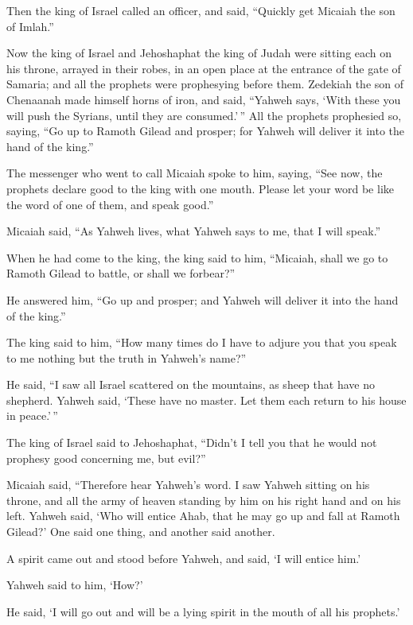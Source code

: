  Then the king of Israel called an officer, and said,
``Quickly get Micaiah the son of Imlah.''

 Now the king of Israel and Jehoshaphat the king of Judah
were sitting each on his throne, arrayed in their robes, in an open
place at the entrance of the gate of Samaria; and all the prophets were
prophesying before them.  Zedekiah the son of Chenaanah
made himself horns of iron, and said, ``Yahweh says, `With these you
will push the Syrians, until they are consumed.'\,''  All
the prophets prophesied so, saying, ``Go up to Ramoth Gilead and
prosper; for Yahweh will deliver it into the hand of the king.''

 The messenger who went to call Micaiah spoke to him,
saying, ``See now, the prophets declare good to the king with one mouth.
Please let your word be like the word of one of them, and speak good.''

 Micaiah said, ``As Yahweh lives, what Yahweh says to me,
that I will speak.''

 When he had come to the king, the king said to him,
``Micaiah, shall we go to Ramoth Gilead to battle, or shall we
forbear?''

He answered him, ``Go up and prosper; and Yahweh will deliver it into
the hand of the king.''

 The king said to him, ``How many times do I have to adjure
you that you speak to me nothing but the truth in Yahweh's name?''

 He said, ``I saw all Israel scattered on the mountains, as
sheep that have no shepherd. Yahweh said, `These have no master. Let
them each return to his house in peace.'\,''

 The king of Israel said to Jehoshaphat, ``Didn't I tell
you that he would not prophesy good concerning me, but evil?''

 Micaiah said, ``Therefore hear Yahweh's word. I saw Yahweh
sitting on his throne, and all the army of heaven standing by him on his
right hand and on his left.  Yahweh said, `Who will entice
Ahab, that he may go up and fall at Ramoth Gilead?' One said one thing,
and another said another.

 A spirit came out and stood before Yahweh, and said, `I
will entice him.'

 Yahweh said to him, `How?'

He said, `I will go out and will be a lying spirit in the mouth of all
his prophets.'


